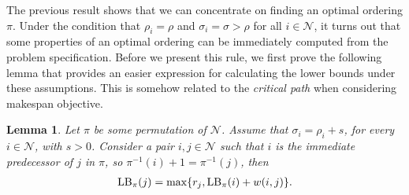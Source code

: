 \documentclass[a4paper]{article}
\theoremstyle{definition}
\theoremstyle{plain}
\newtheorem{lemma}{Lemma}
\begin{document}
The previous result shows that we can concentrate on finding an optimal ordering
$\pi$. Under the condition that $\rho_{i} = \rho$ and $\sigma_{i} = \sigma > \rho$ for all
$i \in \mathcal{N}$, it turns out that some properties of an optimal ordering can
be immediately computed from the problem specification.
%
Before we present this rule, we first prove the following lemma that provides an
easier expression for calculating the lower bounds under these assumptions.
{\color{blue} This is somehow related to the \textit{critical path} when considering makespan objective.}

\begin{lemma}\label{lb_lemma}
  Let $\pi$ be some permutation of $\mathcal{N}$. Assume that
  $\sigma_{i} = \rho_{i} + s$, for every $i \in \mathcal{N}$, with $s > 0$.
  Consider a pair $i,j \in \mathcal{N}$ such that $i$ is the immediate predecessor
  of $j$ in $\pi$, so $\pi^{-1}(i) + 1 = \pi^{-1}(j)$, then
\begin{align}
  \label{eq:lb_lemma}
  \text{\upshape LB}_\pi(j) = \max \{ r_{j}, \text{\upshape LB}_\pi(i) + w(i, j) \} .
\end{align}
\end{lemma}
\end{document}

